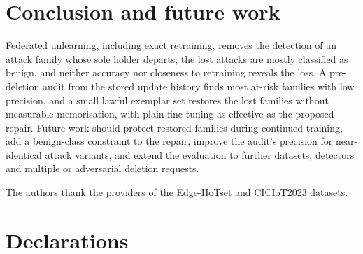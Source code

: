 \documentclass[pdflatex,sn-mathphys-num,iicol]{sn-jnl}
\begin{document}
\section{Conclusion and future work}\label{sec:conclusion}

Federated unlearning, including exact retraining, removes the detection of an attack family whose sole holder departs; the lost attacks are mostly classified as benign, and neither accuracy nor closeness to retraining reveals the loss. A pre-deletion audit from the stored update history finds most at-risk families with low precision, and a small lawful exemplar set restores the lost families without measurable memorisation, with plain fine-tuning as effective as the proposed repair. Future work should protect restored families during continued training, add a benign-class constraint to the repair, improve the audit's precision for near-identical attack variants, and extend the evaluation to further datasets, detectors and multiple or adversarial deletion requests.

\backmatter

The authors thank the providers of the Edge-IIoTset and CICIoT2023 datasets.

\section*{Declarations}\label{sec:decl}
\end{document}
